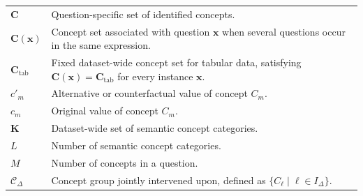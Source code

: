 \begin{longtable}{@{}>{\raggedright\arraybackslash}p{} p{}@{}}
	$\mathbf{C}$                                       & Question-specific set of identified concepts.                                                                                                                                                         \\
	$\mathbf{C}(\mathbf{x})$                           & Concept set associated with question $\mathbf{x}$ when several questions occur in the same expression.                                                                                                \\
	$\mathbf{C}_{\mathrm{tab}}$                        & Fixed dataset-wide concept set for tabular data, satisfying $\mathbf{C}(\mathbf{x})=\mathbf{C}_{\mathrm{tab}}$ for every instance $\mathbf{x}$.                                                       \\
	$c'_m$                                             & Alternative or counterfactual value of concept $C_m$.                                                                                                                                                 \\
	$c_m$                                              & Original value of concept $C_m$.                                                                                                                                                                      \\
	$\mathbf{K}$                                       & Dataset-wide set of semantic concept categories.                                                                                                                                                      \\
	$L$                                                & Number of semantic concept categories.                                                                                                                                                                \\
	$M$                                                & Number of concepts in a question.                                                                                                                                                                     \\
	$\mathcal{C}_{\Delta}$                             & Concept group jointly intervened upon, defined as $\{C_\ell \mid \ell \in I_{\Delta}\}$.                                                                                                              \\

\end{longtable}
